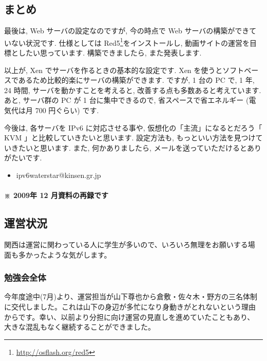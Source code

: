 \documentclass[mingoth,a4paper]{jsarticle}
\begin{document}
\subsection{まとめ}
最後は, Web サーバの設定なのですが, 今の時点で Web サーバの構築ができていない状況です. 仕様としては Red5\footnote{\url{http://osflash.org/red5}}をインストールし, 動画サイトの運営を目標としたい思っています. 構築できましたら, また発表します.

以上が, Xen でサーバを作るときの基本的な設定です. Xen を使うとソフトベースであるため比較的楽にサーバの構築ができます. ですが, 1 台の PC で, 1 年, 24 時間, サーバを動かすことを考えると, 改善する点も多数あると考えています. あと, サーバ群の PC が 1 台に集中できるので, 省スペースで省エネルギー (電気代は月 700 円ぐらい) です.

今後は, 各サーバを IPv6 に対応させる事や, 仮想化の「主流」になるとだろう「 KVM 」と比較していきたいと思います. 設定方法も, もっといい方法を見つけていきたいと思います. また, 何かありましたら, メールを送っていただけるとありがたいです.

\begin{itemize}
\item ipv6waterstar@kinsen.gr.jp
\end{itemize}


\clearpage


\paragraph{※ 2009年 12 月資料の再録です}

\subsection{運営状況}

関西は運営に関わっている人に学生が多いので、いろいろ無理をお願いする場
面も多かったような気がします。

\subsubsection{勉強会全体}

今年度途中(7月)より、運営担当が山下尊也から倉敷・佐々木・野方の三名体制
に交代しました。これは山下の身辺が多忙になり身動きがとれないという理由
からです。幸い、以前より分担に向け運営の見直しを進めていたこともあり、
大きな混乱もなく継続することができました。
\end{document}
